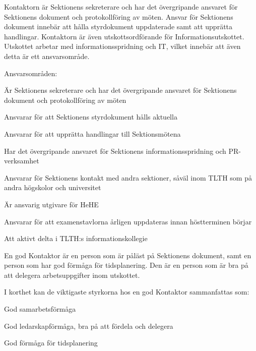 \documentclass[10pt]{article}
\def\post{Kontaktor}
\def\doctitle{Kravprofil för \post}
\begin{document}
    \heading{\doctitle}
    
    
    Kontaktorn är Sektionens sekreterare och har det övergripande ansvaret för Sektionens dokument och
    protokollföring av möten. Ansvar för Sektionens dokument innebär att hålla styrdokument
    uppdaterade samt att upprätta handlingar. Kontaktorn är även utskottsordförande för
    Informationsutskottet. Utskottet arbetar med informationsspridning och IT, vilket
    innebär att även detta är ett ansvarsområde.
    
    Ansvarsområden:
    \begin{dashlist}
        \item Är Sektionens sekreterare och har det övergripande ansvaret för Sektionens dokument och
        protokollföring av möten
        \item Ansvarar för att Sektionens styrdokument hålls aktuella
        \item Ansvarar för att upprätta handlingar till Sektionsmötena
        \item Har det övergripande ansvaret för Sektionens informationsspridning och PR-verksamhet
        \item Ansvarar för Sektionens kontakt med andra sektioner, såväl inom TLTH som på andra
        högskolor och universitet
        \item Är ansvarig utgivare för HeHE
        \item Ansvarar för att examenstavlorna årligen uppdateras innan höstterminen börjar
        \item Att aktivt delta i TLTH:s informationskollegie
    \end{dashlist}
    
    En god Kontaktor är en person som är påläst på Sektionens dokument, samt en person som
    har god förmåga för tidsplanering. Den är en person som är bra på att delegera
    arbetsuppgifter inom utskottet. 
    
    I korthet kan de viktigaste styrkorna hos en god {\post} sammanfattas som:
    \begin{dashlist}
        \item God samarbetsförmåga
        \item God ledarskapförmåga, bra på att fördela och delegera
        \item God förmåga för tidsplanering
    \end{dashlist}
    
\end{document}
